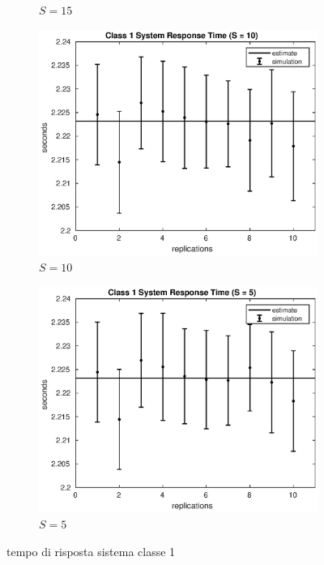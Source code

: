 \begin{figure}[!h]
\begin{subfigure}[t]{0.49\textwidth}
\caption{$S = 15$}
\label{15_s1}
\end{subfigure}
%
\begin{subfigure}[t]{0.49\textwidth}
\includegraphics[width=\textwidth]{figures/simul/10_500K_s1}
\caption{$S = 10$}
\label{10_s1}
\end{subfigure}
%
\begin{subfigure}[t]{0.49\textwidth}
\includegraphics[width=\textwidth]{figures/simul/5_500K_s1}
\caption{$S = 5$}
\label{5_s1}
\end{subfigure}
%
\caption{tempo di risposta sistema classe 1}
\label{plot:s1}
\end{figure}
%
%

